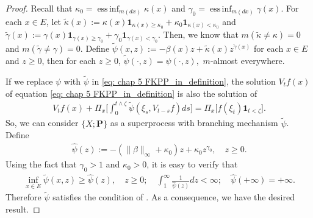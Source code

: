 \documentclass[UTF8]{pkuthss}
\theoremstyle{plain}
\theoremstyle{definition}
\numberwithin{equation}{section}
\begin{document}
\begin{proof}
    Recall that $\kappa_0 = \operatorname{ess\,inf}_{m(dx)} \kappa(x) $ and $\gamma_0 = \operatorname{ess\,inf}_{m(dx)} \gamma(x)$.
	For each $x\in E$, let $\tilde \kappa(x) := \kappa(x) \mathbf 1_{\kappa(x)\geq \kappa_0} + \kappa_0 \mathbf 1_{\kappa(x) < \kappa_0}$ and $\tilde \gamma(x) := \gamma(x) \mathbf 1_{\gamma(x)\geq \gamma_0} + \gamma_0 \mathbf 1_{\gamma(x) < \gamma_0}$.
    Then, we know that $m(\tilde \kappa \neq \kappa) = 0$ and $m(\tilde \gamma \neq \gamma) = 0$.
	Define $\widetilde \psi(x,z) := - \beta(x)z+ \tilde \kappa(x)z^{\tilde \gamma(x)}$ for each $x\in E$ and $z\geq 0$,
	then for each $z\geq 0$, $\widetilde \psi(\cdot, z) = \psi(\cdot , z),$ $m$-almost everywhere.

	If we replace $\psi$ with $\tilde\psi$ in \eqref{eq: chap 5 FKPP_in_definition}, the solution $V_tf(x)$ of equation \eqref{eq: chap 5 FKPP_in_definition} is also the solution of
\begin{align}
	V_t f(x) + \Pi_x \Big[  \int_0^{t\wedge \zeta} \widetilde \psi (\xi_s,V_{t-s} f) ds \Big]
	=\Pi_x \big[ f(\xi_t)\mathbf 1_{t<\zeta} \big].
\end{align}
	So, we can consider $\{X; \mathbf P\}$ as a superprocess with branching mechanism $\tilde \psi$.
	Define
\begin{align}
	\widehat\psi(z)
	:= - (\|\beta\|_\infty +\kappa_0 )z + \kappa_0 z^{\gamma_0},
	\quad z\geq 0.
\end{align}
	Using the fact that $\gamma_0 > 1$ and $\kappa_0 > 0$, it is easy to verify that
\begin{align}
	\inf_{x\in E}\widetilde \psi(x,z)
	\geq \hat\psi(z),
	\quad z\geq 0;
	\quad \int_1^\infty \frac{1}{\widehat\psi(z)} dz
	< \infty;
	\quad \hat \psi(+\infty) = +\infty.
\end{align}
	Therefore $\widetilde \psi$ satisfies the condition of \cite[Lemma 2.3]{RenSongZhang2015Limit}.
	As a consequence, we have the desired result.
\end{proof}
\end{document}
